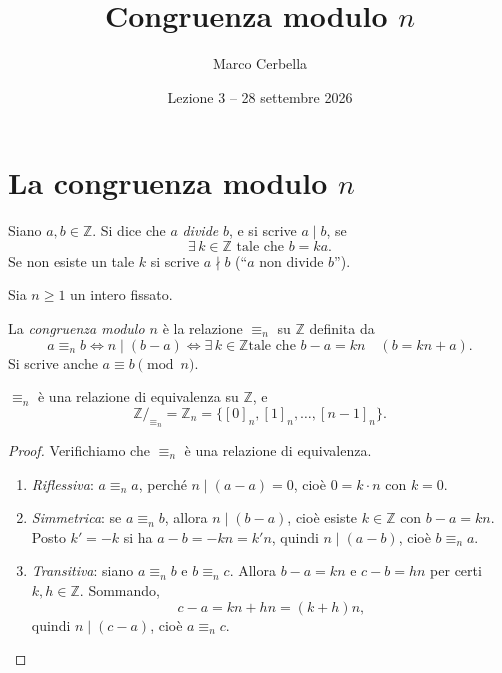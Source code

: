 \documentclass[11pt,a4paper]{article}
\title{Congruenza modulo $n$}
\author{Marco Cerbella}
\date{Lezione 3 -- 28 settembre 2026}
\theoremstyle{definition}
\begin{document}
\maketitle

\section{La congruenza modulo $n$}

\begin{definizione}
Siano $a, b \in \mathbb{Z}$. Si dice che $a$ \emph{divide} $b$, e si scrive
$a \mid b$, se
\[
\exists\, k \in \mathbb{Z} \text{ tale che } b = ka.
\]
Se non esiste un tale $k$ si scrive $a \nmid b$ (``$a$ non divide $b$'').
\end{definizione}

Sia $n \geq 1$ un intero fissato.

\begin{definizione}
La \emph{congruenza modulo $n$} è la relazione $\equiv_n$ su $\mathbb{Z}$
definita da
\[
a \equiv_n b \iff n \mid (b - a) \iff \exists\, k \in \mathbb{Z} \text{
tale che } b - a = kn \quad (b = kn + a).
\]
Si scrive anche $a \equiv b \pmod n$.
\end{definizione}

\begin{proposizione}
$\equiv_n$ è una relazione di equivalenza su $\mathbb{Z}$, e
\[
\mathbb{Z}/_{\equiv_n} = \mathbb{Z}_n = \{[0]_n, [1]_n, \dots, [n-1]_n\}.
\]
\end{proposizione}

\begin{proof}
Verifichiamo che $\equiv_n$ è una relazione di equivalenza.
\begin{enumerate}
    \item \emph{Riflessiva}: $a \equiv_n a$, perché $n \mid (a - a) = 0$,
          cioè $0 = k \cdot n$ con $k = 0$.
    \item \emph{Simmetrica}: se $a \equiv_n b$, allora $n \mid (b - a)$,
          cioè esiste $k \in \mathbb{Z}$ con $b - a = kn$. Posto
          $k' = -k$ si ha $a - b = -kn = k'n$, quindi $n \mid (a - b)$,
          cioè $b \equiv_n a$.
    \item \emph{Transitiva}: siano $a \equiv_n b$ e $b \equiv_n c$.
          Allora $b - a = kn$ e $c - b = hn$ per certi $k, h \in
          \mathbb{Z}$. Sommando,
          \[
          c - a = kn + hn = (k + h)n,
          \]
          quindi $n \mid (c - a)$, cioè $a \equiv_n c$. \qedhere
\end{enumerate}
\end{proof}
\end{document}
